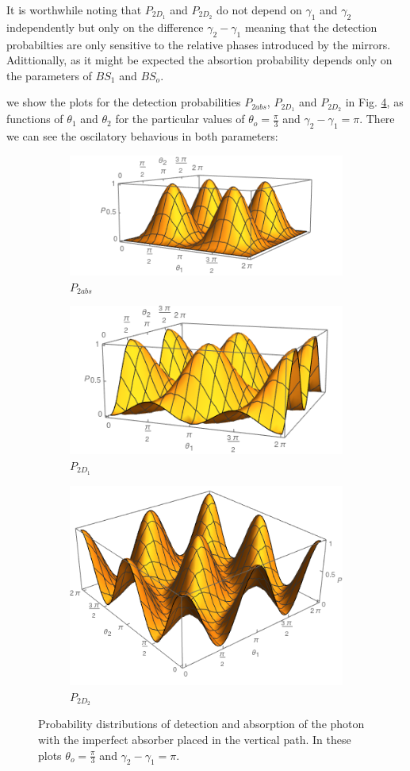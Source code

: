 \documentclass{book}
\begin{document}
It is worthwhile noting that $P_{2D_{1}}$ and $P_{2D_{2}}$ do not depend on $\gamma_{1}$ and $\gamma_{2}$ independently but only on the difference $\gamma_{2}-\gamma_{1}$ meaning that the detection probabilties are only sensitive to the relative phases introduced by the mirrors. Adittionally, as it might be expected the absortion probability depends only on the parameters of $BS_{1}$ and $BS_{o}$.

we show the plots for the detection probabilities $P_{2abs}$, $P_{2D_{1}}$ and $P_{2D_{2}}$ in Fig. \ref{P_bs}, as functions of $\theta_{1}$ and $\theta_{2}$ for the particular values of $\theta_{o}=\frac{\pi}{3}$ and $\gamma_{2}-\gamma_{1}=\pi$. There we can see the oscilatory behavious in both parameters:


\begin{figure}[H]
\centering
\begin{subfigure}[b]{0.45\linewidth}
\includegraphics[width=\linewidth,height=2.8 cm]{images/P1abs.png}
\caption{$P_{2abs}$}
\label{fig:BS2}
\end{subfigure}
\begin{subfigure}[b]{0.45\linewidth}
\includegraphics[width=\linewidth,height=2.8 cm]{images/P1d1.png}
\caption{$P_{2D_{1}}$}
\label{fig:westminster_aerea}
\end{subfigure}
\begin{subfigure}[b]{0.45\linewidth}
\includegraphics[width=\linewidth,height=2.8 cm]{images/P1d2.png}
\caption{$P_{2D_{2}}$}
\label{fig:BS2}
\end{subfigure}
\caption{Probability distributions of detection and absorption of the photon with the imperfect absorber placed in the vertical path. In these plots $\theta_{o}=\frac{\pi}{3}$ and $\gamma_{2}-\gamma_{1}=\pi$.}
\label{P_bs}
\end{figure}
\end{document}
